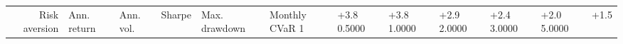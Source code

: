 \begin{tabular}{rlllllll}
\toprule
Risk aversion & Ann. return & Ann. vol. & Sharpe & Max. drawdown & Monthly CVaR 1%
 & +3.8%
0.5000 & +3.8%
1.0000 & +2.9%
2.0000 & +2.4%
3.0000 & +2.0%
5.0000 & +1.5%
\bottomrule
\end{tabular}
